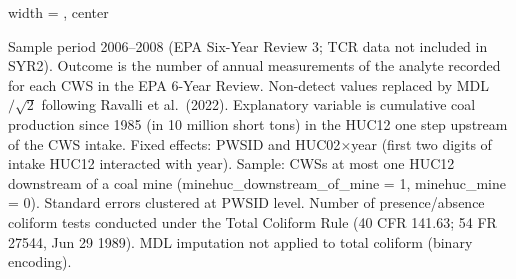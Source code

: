 \begin{table}[htbp]
\begin{adjustbox}{width = \textwidth, center}
      
   \end{adjustbox}
      {\tiny\linespread{1}\selectfont \par \raggedright 
   Sample period 2006--2008 (EPA Six-Year Review 3; TCR data not included in SYR2). Outcome is the number of annual measurements of the analyte recorded for each CWS in the EPA 6-Year Review. Non-detect values replaced by MDL$/\sqrt{2}$ following Ravalli et al.~(2022). Explanatory variable is cumulative coal production since 1985 (in 10 million short tons) in the HUC12 one step upstream of the CWS intake. Fixed effects: PWSID and HUC02$\times$year (first two digits of intake HUC12 interacted with year). Sample: CWSs at most one HUC12 downstream of a coal mine (minehuc\_downstream\_of\_mine = 1, minehuc\_mine = 0). Standard errors clustered at PWSID level. Number of presence/absence coliform tests conducted under the Total Coliform Rule (40 CFR 141.63; 54 FR 27544, Jun 29 1989). MDL imputation not applied to total coliform (binary encoding).}
   
\end{table}


